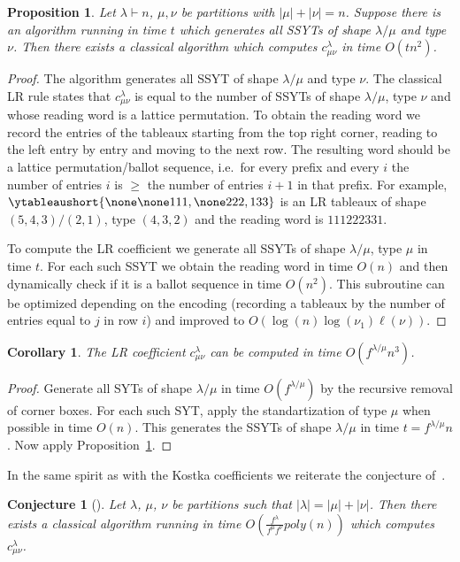 \documentclass[11pt]{amsart}
\newtheorem{cor}[thm]{Corollary}
\newtheorem{prop}[thm]{Proposition}
\newtheorem{conj}[thm]{Conjecture}
\theoremstyle{plain}
\theoremstyle{definition}
\numberwithin{equation}{section}
\newcommand{\la}{\lambda}
\newcommand{\poly}{poly}
\def\la{\lambda}
\begin{document}
\begin{prop}\label{prop:LR_kostka}
Let $\la \vdash n$, $\mu,\nu$ be partitions with $|\mu|+|\nu|=n$. Suppose there is an algorithm running in time $t$ which generates all SSYTs of shape $\la/\mu$ and type $\nu$. Then there exists a classical algorithm which computes $c^\la_{\mu\nu}$ in time $O(t n^2)$.
\end{prop}
\begin{proof}
The algorithm generates all SSYT of shape $\la/\mu$ and type $\nu$. 
The classical LR rule states that $c^\la_{\mu\nu}$ is equal to the number of SSYTs of shape $\la/\mu$, type $\nu$ and whose reading word is a lattice permutation. To obtain the reading word we record the entries of the tableaux starting from the top right corner, reading to the left entry by entry and moving to the next row. The resulting word should be a lattice permutation/ballot sequence, i.e.\ for every prefix and every $i$ the number of entries $i$ is $\geq$ the number of entries $i+1$ in that prefix.
For example, $\ytableaushort{ \none\none 111, \none 222,133}$ is an LR tableaux of shape $(5,4,3)/(2,1)$, type $(4,3,2)$ and the reading word is $111222331$.

To compute the LR coefficient we generate all SSYTs of shape $\la/\mu$, type $\mu$ in time $t$. 
For each such SSYT  we obtain the reading word in time $O(n)$ and then dynamically check if it is a ballot sequence in time $O(n^2)$. This subroutine can be optimized depending on the encoding (recording a tableaux by the number of entries equal to $j$ in row $i$) and improved to $O(\log(n) \log(\nu_1)\ell(\nu))$. 
\end{proof}

\begin{cor}
The LR coefficient $c^\la_{\mu\nu}$ can be computed in time $O(f^{\la/\mu}n^3)$.
\end{cor}
%

\begin{proof}
Generate all SYTs of shape $\la/\mu$ in time $O(f^{\la/\mu})$ by the recursive removal of corner boxes. For each such SYT, apply the standartization of type $\mu$ when possible in time $O(n)$. This generates the SSYTs of shape $\la/\mu$ in time $t=f^{\la/\mu}n$. Now apply Proposition~\ref{prop:LR_kostka}.
\end{proof}

In the same spirit as with the Kostka coefficients we reiterate the conjecture of~\cite{LH24}.

\begin{conj}[\cite{LH24}]\label{conj:lr}
Let $\la$, $\mu$, $\nu$ be partitions such that $|\la|=|\mu|+|\nu|$. Then there exists a classical algorithm running in time $O(\frac{f^\la}{f^\mu f^\nu} \poly(n))$ which computes $c^\la_{\mu\nu}$.
\end{conj}
\end{document}
